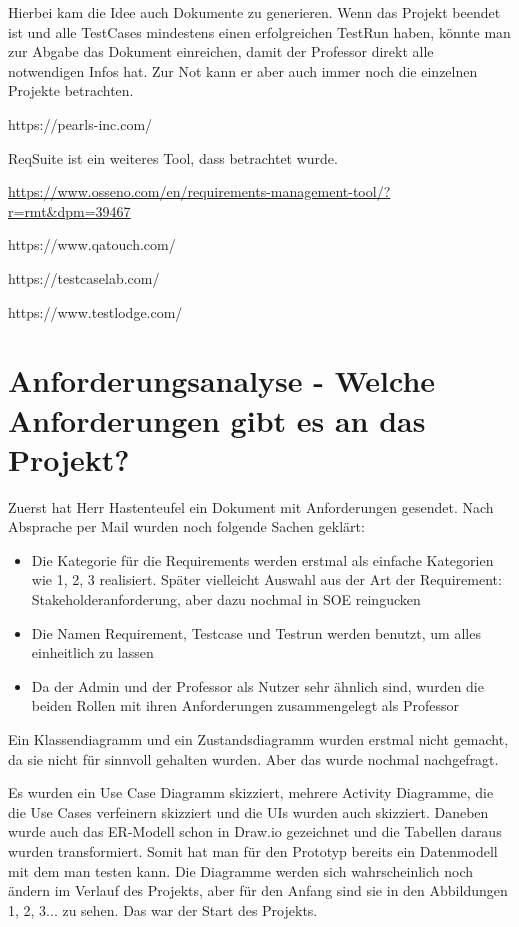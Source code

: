 \documentclass[11pt,a4paper]{report}
\begin{document}
Hierbei kam die Idee auch Dokumente zu generieren. Wenn das Projekt beendet ist und alle TestCases mindestens einen erfolgreichen TestRun haben, könnte man zur Abgabe das Dokument einreichen, damit der Professor direkt alle notwendigen Infos hat. Zur Not kann er aber auch immer noch die einzelnen Projekte betrachten. 

https://pearls-inc.com/


ReqSuite ist ein weiteres Tool, dass betrachtet wurde.

\url{https://www.osseno.com/en/requirements-management-tool/?r=rmt&dpm=39467}


https://www.qatouch.com/

https://testcaselab.com/

https://www.testlodge.com/

\chapter{Anforderungsanalyse - Welche Anforderungen gibt es an das Projekt?} \label{chap:Anforderungen}

Zuerst hat Herr Hastenteufel ein Dokument mit Anforderungen gesendet. Nach Absprache per Mail wurden noch folgende Sachen geklärt:
\begin{itemize}
\item Die Kategorie für die Requirements werden erstmal als einfache Kategorien wie 1, 2, 3 realisiert. Später vielleicht Auswahl aus der Art der Requirement: Stakeholderanforderung, aber dazu nochmal in SOE reingucken

\item Die Namen Requirement, Testcase und Testrun werden benutzt, um alles einheitlich zu lassen

\item Da der Admin und der Professor als Nutzer sehr ähnlich sind, wurden die beiden Rollen mit ihren Anforderungen zusammengelegt als Professor 
\end{itemize}


Ein Klassendiagramm und ein Zustandsdiagramm wurden erstmal nicht gemacht, da sie nicht für sinnvoll gehalten wurden. Aber das wurde nochmal nachgefragt.

Es wurden ein Use Case Diagramm skizziert, mehrere Activity Diagramme, die die Use Cases verfeinern skizziert und die UIs wurden auch skizziert. Daneben wurde auch das ER-Modell schon in Draw.io gezeichnet und die Tabellen daraus wurden transformiert. Somit hat man für den Prototyp bereits ein Datenmodell mit dem man testen kann. Die Diagramme werden sich wahrscheinlich noch ändern im Verlauf des Projekts, aber für den Anfang sind sie in den Abbildungen 1, 2, 3... zu sehen. Das war der Start des Projekts.
\end{document}
